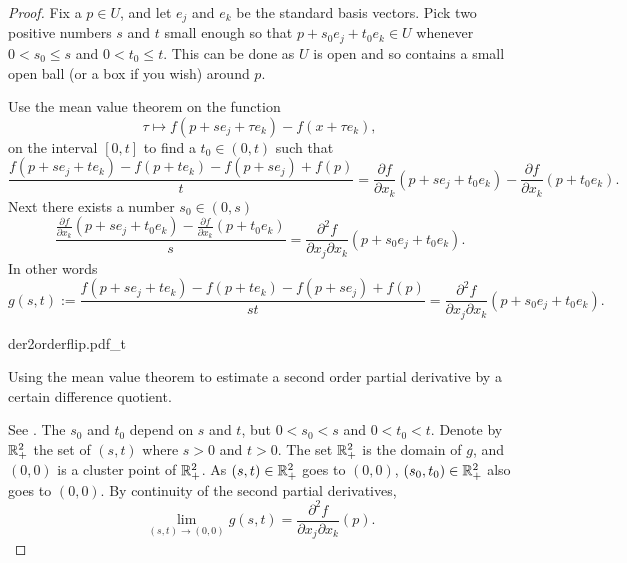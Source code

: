 \begin{proof}
Fix a $p \in U$, and let $e_j$ and $e_k$ be the standard basis vectors.
Pick two positive numbers $s$ and $t$ small enough so that
$p+s_0e_j +t_0e_k \in U$ whenever
$0 < s_0 \leq s$ and $0 < t_0 \leq t$.  This can be done as $U$ is open and so
contains a small open ball (or a box if you wish) around $p$.

Use the mean value theorem on the function
\begin{equation*}
\tau \mapsto f(p+se_j + \tau e_k)-f(x + \tau e_k) ,
\end{equation*}
on the interval $[0,t]$
to find a $t_0 \in (0,t)$
such that
\begin{equation*}
\frac{f(p+se_j + te_k)- f(p+t e_k) - f(p+s e_j)+f(p)}{t}
=
\frac{\partial f}{\partial x_k}(p + s e_j + t_0 e_k)
-
\frac{\partial f}{\partial x_k}(p + t_0 e_k) .
\end{equation*}
Next there exists a number $s_0 \in (0,s)$
\begin{equation*}
\frac{\frac{\partial f}{\partial x_k}(p + s e_j + t_0 e_k)
-
\frac{\partial f}{\partial x_k}(p + t_0 e_k)}{s}
=
\frac{\partial^2 f}{\partial x_j \partial x_k}(p + s_0 e_j + t_0 e_k) .
\end{equation*}
In other words
\begin{equation*}
g(s,t) :=
\frac{f(p+se_j + te_k)- f(p+t e_k) - f(p+s e_j)+f(p)}{st}
=
\frac{\partial^2 f}{\partial x_j \partial x_k}(p + s_0 e_j + t_0 e_k) .
\end{equation*}

\begin{myfigureht}
{der2orderflip.pdf_t}
\caption{Using the mean value theorem to estimate
a second order partial derivative by
a certain difference quotient.\label{fig:der2orderflip}}
\end{myfigureht}

See .
The $s_0$ and $t_0$ depend on $s$ and $t$,
but $0 < s_0 < s$ and
$0 < t_0 < t$.
Denote by ${\mathbb{R}}_+^2$ the set of $(s,t)$ where $s > 0$ and $t > 0$.
The set ${\mathbb{R}}_+^2$ is the domain of $g$, and $(0,0)$ is a cluster
point of ${\mathbb{R}}_+^2$.
As $(s,t) \in {\mathbb{R}}_+^2$ goes to $(0,0)$, $(s_0,t_0) \in {\mathbb{R}}_+^2$ also goes to
$(0,0)$.
By continuity of the second partial derivatives,
\begin{equation*}
\lim_{(s,t) \to (0,0)} g(s,t) = 
\frac{\partial^2 f}{\partial x_j \partial x_k}(p) .
\end{equation*}


\end{proof}
